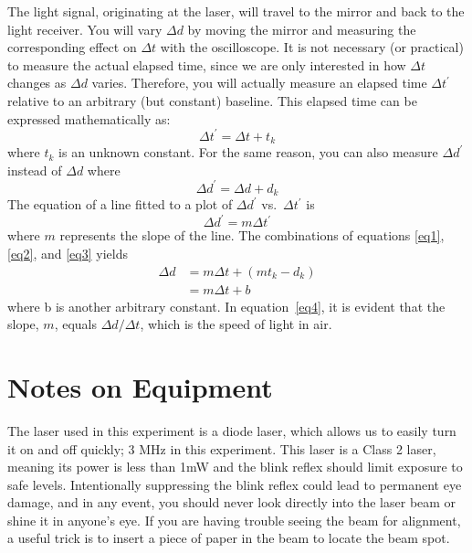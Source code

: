 \documentclass{tufte-handout}
\begin{document}
The light signal, originating at the laser, will travel to the mirror and 
back to the light receiver. You will vary $\Delta d$ by moving the mirror and 
measuring the corresponding effect on $\Delta t$ with the oscilloscope.
It is not necessary (or practical) to measure the actual elapsed time, 
since we are only interested in how $\Delta t$ changes as $\Delta d$ varies. 
Therefore, you will actually measure an elapsed time $\Delta t^\prime$ relative to an 
arbitrary (but constant) baseline. This elapsed time can be expressed 
mathematically as:
\begin{equation}
\label{eq1}
\Delta t^\prime = \Delta t + t_k
\end{equation}
where $t_k$ is an unknown constant. For the same reason, you can also 
measure $\Delta d^\prime$ instead of $\Delta d$ where
\begin{equation}
\label{eq2}
\Delta d^\prime = \Delta d + d_k
\end{equation}
The equation of a line fitted to a plot of $\Delta d^\prime$ vs.\ $\Delta t^\prime$ is 
\begin{equation}
\label{eq3}
\Delta d^\prime = m \Delta t^\prime
\end{equation}
where $m$ represents the slope of the line. The combinations of 
equations \ref{eq1}, \ref{eq2}, and \ref{eq3} yields
\begin{align}
\label{eq4}
\Delta d & = m \Delta t + \left( m t_k - d_k \right) \nonumber \\
               & = m \Delta t + b 
\end{align}
where b is another arbitrary constant. In equation~\ref{eq4}, it is evident that 
the slope, $m$, equals $\Delta d/\Delta t$, which is the speed of light in air.

\section{Notes on Equipment}

The laser used in this experiment is a diode laser, which allows us to easily turn it on and off quickly; 3 MHz in this experiment.  This laser is a Class 2 laser, meaning its power is less than 1mW and the blink reflex should limit exposure to safe levels.  Intentionally suppressing the blink reflex could lead to permanent eye damage, and in any event, you should never look directly into the laser beam or shine it in anyone's eye.  If you are having trouble seeing the beam for alignment, a useful trick is to insert a piece of paper in the beam to locate the beam spot.
\end{document}
